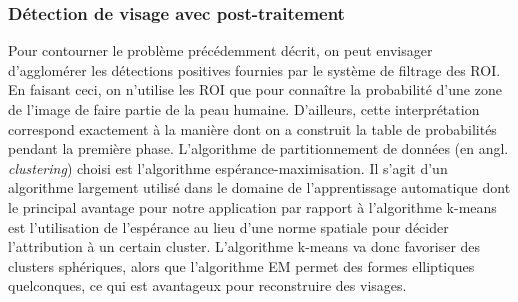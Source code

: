 \documentclass[a4paper,11pt]{article}
\begin{document}
\subsubsection{Détection de visage avec post-traitement}
Pour contourner le problème précédemment décrit, on peut envisager d'agglomérer les détections positives fournies par le système de filtrage des ROI.
En faisant ceci, on n'utilise les ROI que pour connaître la probabilité d'une zone de l'image de faire partie de la peau humaine.
D'ailleurs, cette interprétation correspond exactement à la manière dont on a construit la table de probabilités pendant la première phase.
\newline
\newline
L'algorithme de partitionnement de données (en angl. {\textit{clustering}}) choisi est l'algorithme espérance-maximisation.
Il s'agit d'un algorithme largement utilisé dans le domaine de l'apprentissage automatique dont le principal avantage pour notre application par rapport à l'algorithme k-means est l'utilisation de l'espérance au lieu d'une norme spatiale pour décider l'attribution à un certain cluster.
L'algorithme k-means va donc favoriser des clusters sphériques, alors que l'algorithme EM permet des formes elliptiques quelconques, ce qui est avantageux pour reconstruire des visages.\\
\newline
\end{document}
